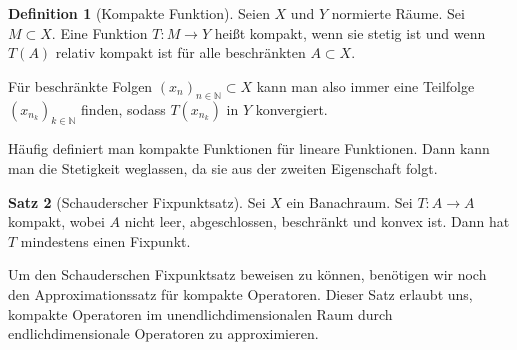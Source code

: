 \documentclass[a4paper]{article}
\theoremstyle{definition}
\newtheorem{theorem}{Satz}
\newtheorem{definition}[theorem]{Definition}
\begin{document}
\begin{definition}[Kompakte Funktion]
    Seien $X$ und $Y$ normierte Räume. Sei $M \subset X$. Eine Funktion $T: M \to Y$ hei\ss t kompakt, wenn sie stetig ist und wenn $T(A)$ relativ kompakt ist für alle beschränkten $A \subset X$.
\end{definition}

Für beschränkte Folgen $(x_n)_{n \in \mathbb{N}} \subset X$ kann man also immer eine Teilfolge $(x_{n_k})_{k \in \mathbb N}$ finden, sodass $T(x_{n_k})$ in $Y$ konvergiert.
 
Häufig definiert man kompakte Funktionen für lineare Funktionen. Dann kann man die Stetigkeit weglassen, da sie aus der zweiten Eigenschaft folgt.

\begin{theorem}[Schauderscher Fixpunktsatz]
    Sei $X$ ein Banachraum. Sei $T: A \to A$ kompakt, wobei $A$ nicht leer, abgeschlossen, beschränkt und konvex ist. Dann hat $T$ mindestens einen Fixpunkt.
\end{theorem}

Um den Schauderschen Fixpunktsatz beweisen zu können, benötigen wir noch den Approximationssatz für kompakte Operatoren. Dieser Satz erlaubt uns, kompakte Operatoren im unendlichdimensionalen Raum durch endlichdimensionale Operatoren zu approximieren.

\vspace{1em}


\end{document}
